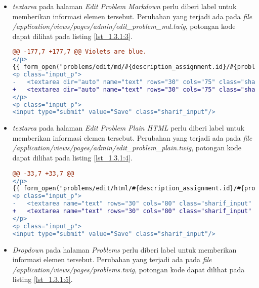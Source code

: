 \begin{itemize}
	\item \textit{textarea} pada halaman \textit{Edit Problem Markdown} perlu diberi label untuk memberikan informasi elemen tersebut. Perubahan yang terjadi ada pada \textit{file} \textit{/application/views/pages/admin/edit\_problem\_md.twig}, potongan kode dapat dilihat pada listing \ref{lst_1.3.1:3}.

\begin{lstlisting}[language=diff, caption=Perubahan pada \textit{file} \textit{edit\_problem\_md.twig}, label=lst_1.3.1:3, basicstyle=\ttfamily, frame=single,
columns=fullflexible, keepspaces=true, breaklines=true]
@@ -177,7 +177,7 @@ Violets are blue.
</p>
{{ form_open("problems/edit/md/#{description_assignment.id}/#{problem.id}") }}
<p class="input_p">
- 	<textarea dir="auto" name="text" rows="30" cols="75" class="sharif_input" id="md_editor">{{ problem.description }}</textarea>
+ 	<textarea dir="auto" name="text" rows="30" cols="75" class="sharif_input" id="md_editor" aria-label="Markdown Editor">{{ problem.description }}</textarea>
</p>
<p class="input_p">
<input type="submit" value="Save" class="sharif_input"/>
\end{lstlisting}

	\item \textit{textarea} pada halaman \textit{Edit Problem Plain HTML} perlu diberi label untuk memberikan informasi elemen tersebut. Perubahan yang terjadi ada pada \textit{file} \textit{/application/views/pages/admin/edit\_problem\_plain.twig}, potongan kode dapat dilihat pada listing \ref{lst_1.3.1:4}.
	
\begin{lstlisting}[language=diff, caption=Perubahan pada \textit{file} \textit{edit\_problem\_plain.twig}, label=lst_1.3.1:4, basicstyle=\ttfamily, frame=single,
columns=fullflexible, keepspaces=true, breaklines=true]
@@ -33,7 +33,7 @@
</p>
{{ form_open("problems/edit/html/#{description_assignment.id}/#{problem.id}") }}
<p class="input_p">
- 	<textarea name="text" rows="30" cols="80" class="sharif_input" id="html_editor">{{ problem.description }}</textarea>
+ 	<textarea name="text" rows="30" cols="80" class="sharif_input" id="html_editor" aria-label="HTML Editor">{{ problem.description }}</textarea>
</p>
<p class="input_p">
<input type="submit" value="Save" class="sharif_input"/>
\end{lstlisting}
	
	\item \textit{Dropdown} pada halaman \textit{Problems} perlu diberi label untuk memberikan informasi elemen tersebut. Perubahan yang terjadi ada pada \textit{file} \textit{/application/views/pages/problems.twig}, potongan kode dapat dilihat pada listing \ref{lst_1.3.1:5}.
	

\end{itemize}
